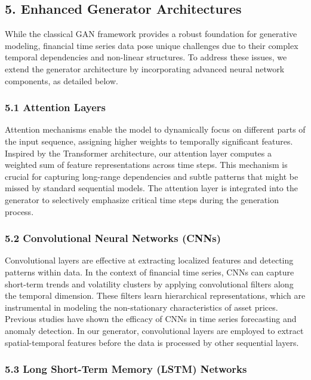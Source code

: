 \documentclass{article}
\begin{document}
\subsection*{5. Enhanced Generator Architectures}

While the classical GAN framework provides a robust foundation for generative modeling, financial time series data pose unique challenges due to their complex temporal dependencies and non-linear structures. To address these issues, we extend the generator architecture by incorporating advanced neural network components, as detailed below.

\subsubsection*{5.1 Attention Layers}

Attention mechanisms enable the model to dynamically focus on different parts of the input sequence, assigning higher weights to temporally significant features. Inspired by the Transformer architecture, our attention layer computes a weighted sum of feature representations across time steps. This mechanism is crucial for capturing long-range dependencies and subtle patterns that might be missed by standard sequential models. The attention layer is integrated into the generator to selectively emphasize critical time steps during the generation process.

\subsubsection*{5.2 Convolutional Neural Networks (CNNs)}

Convolutional layers are effective at extracting localized features and detecting patterns within data. In the context of financial time series, CNNs can capture short-term trends and volatility clusters by applying convolutional filters along the temporal dimension. These filters learn hierarchical representations, which are instrumental in modeling the non-stationary characteristics of asset prices. Previous studies have shown the efficacy of CNNs in time series forecasting and anomaly detection. In our generator, convolutional layers are employed to extract spatial-temporal features before the data is processed by other sequential layers.

\subsubsection*{5.3 Long Short-Term Memory (LSTM) Networks}
\end{document}
